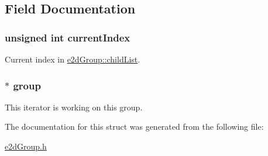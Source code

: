 \subsection{Field Documentation}
\hypertarget{structe2dGroupIterator_a932f59c8e81a171eb21af8d204d1c13d}{
\subsubsection[{current\-Index}]{\setlength{\rightskip}{0pt plus 5cm}unsigned int {\bf current\-Index}}}\label{structe2dGroupIterator_a932f59c8e81a171eb21af8d204d1c13d}
Current index in \hyperlink{structe2dGroup_a55f6dde874716dc99dcd270fc0999a01}{e2d\-Group\-::child\-List}. \hypertarget{structe2dGroupIterator_a13e9c2162587f7af49d2ceb78c380444}{
\subsubsection[{group}]{$\ast$ {\bf group}}}\label{structe2dGroupIterator_a13e9c2162587f7af49d2ceb78c380444}
This iterator is working on this group. 

The documentation for this struct was generated from the following file\-:\begin{DoxyCompactItemize}
\item 
\hyperlink{e2dGroup_8h}{e2d\-Group.\-h}\end{DoxyCompactItemize}

